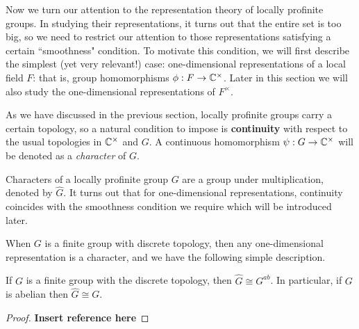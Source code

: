 Now we turn our attention to the representation theory of locally profinite groups. In studying their representations, it turns out that the entire set is too big, so we need to restrict our attention to those representations satisfying a certain ``smoothness" condition. To motivate this condition, we will first describe the simplest (yet very relevant!) case: one-dimensional representations of a local field $F$: that is, group homomorphisms $\phi:F\rightarrow\mathbb{C}^{\times}$. Later in this section we will also study the one-dimensional representations of $F^{\times}$.

As we have discussed in the previous section, locally profinite groups carry a certain topology, so a natural condition to impose is \textbf{continuity} with respect to the usual topologies in $\mathbb{C}^{\times}$ and $G$. A continuous homomorphism $\psi:G\rightarrow\mathbb{C}^{\times}$ will be denoted as a \textit{character} of $G$.

Characters of a locally profinite group $G$ are a group under multiplication, denoted by $\hat{G}$. It turns out that for one-dimensional representations, continuity coincides with the smoothness condition we require which will be introduced later. 

When $G$ is a finite group with discrete topology, then any one-dimensional representation is a character, and we have the following simple description.

\begin{prop}
    If $G$ is a finite group with the discrete topology, then $\hat{G}\cong G^{ab}$. In particular, if $G$ is abelian then $\hat{G}\cong G$.
\end{prop}
\begin{proof}
    \textbf{Insert reference here}
\end{proof}

